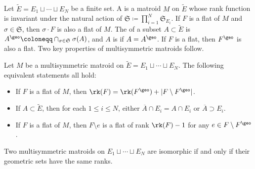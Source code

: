 \subsection{}
Let $\widetilde E = E_1 \sqcup \cdots \sqcup E_N$ be a finite set. A  is a matroid $M$ on $\widetilde E$ whose rank function is invariant under the natural action of $\mathfrak S \coloneqq  \prod_{i=1}^N \mathfrak S_{E_i}$.
If $F$ is a flat of $M$ and $\sigma \in \mathfrak S$, then $\sigma \cdot F$ is also a flat of $M$.
The  of a subset $A \subset \widetilde E$ is $A^\geo \coloneqq  \cap_{\sigma \in \mathfrak S} \sigma(A)$, and $A$ is  if $A = A^\geo$.
If $F$ is a flat, then $F^\geo$ is also a flat.
Two key properties of multisymmetric matroids follow.
\begin{lemm}\label{rankformula}\label{closure}\label{multisymmetricsubtraction}
  Let $M$ be a multisymmetric matroid on $\widetilde E = E_1 \sqcup \cdots \sqcup E_N$.
  The following equivalent statements all hold:
  \begin{itemize}
  \item If $F$ is a flat of $M$, then $\rk(F) = \rk(F^\geo) + |F \setminus F^\geo|$.
  \item If $A \subset \widetilde E$, then for each $1 \leq i \leq N$, either $\overline{A} \cap E_i = A \cap E_i$ or $\overline A \supset E_i$.
  \item If $F$ is a flat of $M$, then $F \setminus e$ is a flat of rank $\rk(F) - 1$ for any $e \in F \setminus F^\geo$.
  \end{itemize}
\end{lemm}

\begin{lemm}\label{determinedbygeo}
  Two multisymmetric matroids on $E_1 \sqcup \cdots \sqcup E_N$ are isomorphic if and only if their geometric sets have the same ranks.
\end{lemm}

